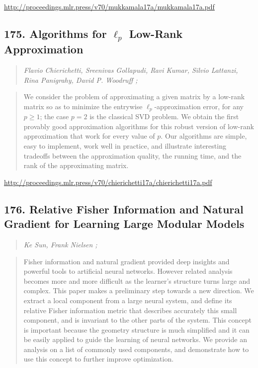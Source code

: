 \documentclass{article}
\begin{document}
\href{http://proceedings.mlr.press/v70/mukkamala17a/mukkamala17a.pdf}{http://proceedings.mlr.press/v70/mukkamala17a/mukkamala17a.pdf}

\subsection{175. Algorithms for $\ell_p$ Low-Rank Approximation}

\begin{quote}
\footnotesize{\textit{Flavio Chierichetti, Sreenivas Gollapudi, Ravi Kumar, Silvio Lattanzi, Rina Panigrahy, David P. Woodruff ;}}
\end{quote}

\begin{quote}
    We consider the problem of approximating a given matrix by a low-rank matrix so as to minimize the entrywise $\ell_p$-approximation error, for any $p \geq 1$; the case $p = 2$ is the classical SVD problem. We obtain the first provably good approximation algorithms for this robust version of low-rank approximation that work for every value of $p$. Our algorithms are simple, easy to implement, work well in practice, and illustrate interesting tradeoffs between the approximation quality, the running time, and the rank of the approximating matrix.  \end{quote}

\href{http://proceedings.mlr.press/v70/chierichetti17a/chierichetti17a.pdf}{http://proceedings.mlr.press/v70/chierichetti17a/chierichetti17a.pdf}

\subsection{176. Relative Fisher Information and Natural Gradient for Learning Large Modular Models}

\begin{quote}
\footnotesize{\textit{Ke Sun, Frank Nielsen ;}}
\end{quote}

\begin{quote}
    Fisher information and natural gradient provided deep insights and powerful tools to artificial neural networks. However related analysis becomes more and more difficult as the learner’s structure turns large and complex. This paper makes a preliminary step towards a new direction. We extract a local component from a large neural system, and define its relative Fisher information metric that describes accurately this small component, and is invariant to the other parts of the system. This concept is important because the geometry structure is much simplified and it can be easily applied to guide the learning of neural networks. We provide an analysis on a list of commonly used components, and demonstrate how to use this concept to further improve optimization.  \end{quote}
\end{document}
